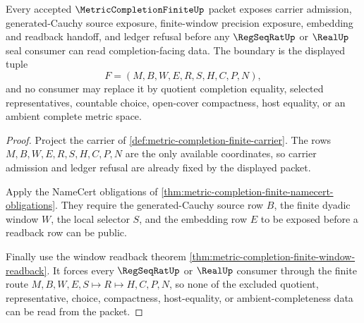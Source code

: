 \begin{theorem}
\label{thm:metric-completion-finite-obligation-boundary}
Every accepted $\MetricCompletionFiniteUp$ packet exposes carrier admission, generated-Cauchy source exposure, finite-window precision exposure, embedding and readback handoff, and ledger refusal before any $\RegSeqRatUp$ or $\RealUp$ seal consumer can read completion-facing data. The boundary is the displayed tuple
$$
F=(M,B,W,E,R,S,H,C,P,N),
$$
and no consumer may replace it by quotient completion equality, selected representatives, countable choice, open-cover compactness, host equality, or an ambient complete metric space.
\end{theorem}
\begin{proof}
Project the carrier of \autoref{def:metric-completion-finite-carrier}. The rows $M,B,W,E,R,S,H,C,P,N$ are the only available coordinates, so carrier admission and ledger refusal are already fixed by the displayed packet.

Apply the NameCert obligations of \autoref{thm:metric-completion-finite-namecert-obligations}. They require the generated-Cauchy source row $B$, the finite dyadic window $W$, the local selector $S$, and the embedding row $E$ to be exposed before a readback row can be public.

Finally use the window readback theorem \autoref{thm:metric-completion-finite-window-readback}. It forces every $\RegSeqRatUp$ or $\RealUp$ consumer through the finite route $M,B,W,E,S \longmapsto R \longmapsto H,C,P,N$, so none of the excluded quotient, representative, choice, compactness, host-equality, or ambient-completeness data can be read from the packet.
\end{proof}

